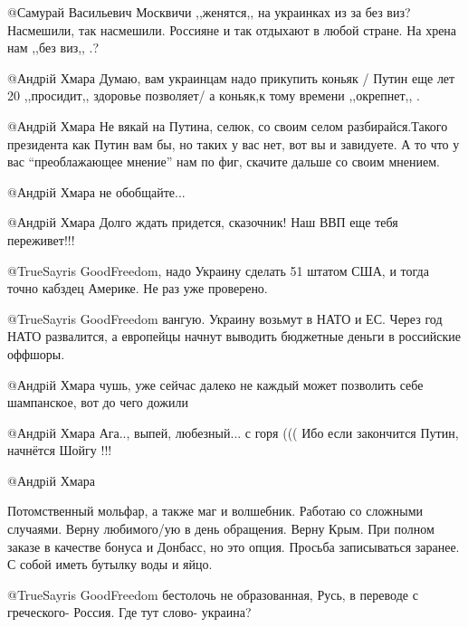 \begin{itemize}
\begin{itemize}
@Самурай Васильевич  Москвичи ,,женятся,, на украинках из за без виз?
Насмешили, так насмешили. Россияне и так отдыхают в любой стране. На хрена нам
,,без виз,, .?


@Андрiй Хмара  Думаю, вам украинцам надо прикупить коньяк / Путин еще лет 20
,,просидит,, здоровье позволяет/ а коньяк,к тому времени ,,окрепнет,, .


@Андрiй Хмара  Не вякай на Путина, селюк, со своим селом разбирайся.Такого
президента как Путин вам бы, но таких у вас нет, вот вы и завидуете. А то что
у вас \enquote{преоблажающее мнение}  нам по фиг, скачите дальше со своим мнением.


@Андрiй Хмара  не обобщайте...


@Андрiй Хмара  Долго ждать придется, сказочник! Наш ВВП еще тебя переживет!!!


@TrueSayris GoodFreedom, надо Украину сделать 51 штатом США, и тогда точно
кабздец Америке. Не раз уже проверено.


@TrueSayris GoodFreedom  вангую. Украину возьмут в НАТО и ЕС. Через год НАТО
развалится, а европейцы начнут выводить бюджетные деньги в российские оффшоры.


@Андрiй Хмара  чушь, уже сейчас далеко не каждый может позволить себе
шампанское, вот до чего дожили


@Андрiй Хмара  Ага.., выпей, любезный... с горя ((( Ибо если закончится Путин,
начнётся Шойгу !!!

 @Андрiй Хмара  

Потомственный мольфар, а также маг и волшебник. 
Работаю со сложными случаями.
Верну любимого/ую в день обращения. Верну Крым. При полном заказе в качестве бонуса и Донбасс, но это опция.
Просьба записываться заранее. С собой иметь бутылку воды и яйцо.


@TrueSayris GoodFreedom  бестолочь не образованная, Русь, в переводе с
греческого- Россия. Где тут слово- украина?



\end{itemize}
\end{itemize}
